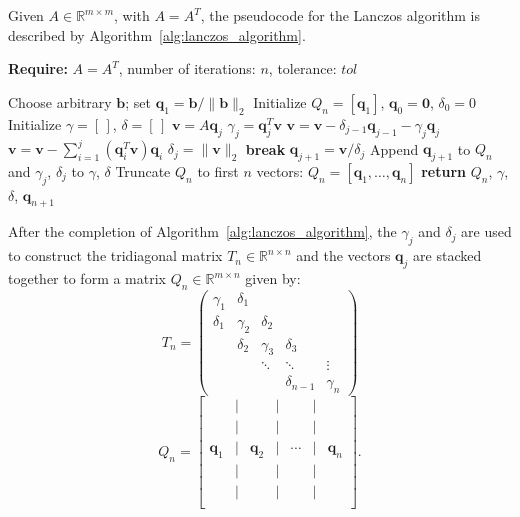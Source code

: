 Given $A \in \mathbb{R}^{m \times m}$, with $A=A^T$, the pseudocode for the Lanczos algorithm is described by Algorithm~\ref{alg:lanczos_algorithm}.
\begin{algorithm}
	\caption{Lanczos Algorithm for a Symmetric Matrix}
	\label{alg:lanczos_algorithm}

	\textbf{Require:} \( A = A^T \), number of iterations: \(n\), tolerance: \(tol\)
	\begin{algorithmic}[1]
		\State Choose arbitrary $\mathbf{b}$; set $\mathbf{q}_1 = \mathbf{b} / \|\mathbf{b}\|_2$
		\State Initialize $Q_n = [\mathbf{q}_1]$, $\mathbf{q}_0 = \mathbf{0}$, $\delta_0 = 0$
		\State Initialize $\gamma = [\,]$, $\delta = [\,]$ 
		\State $\mathbf{v} = A \mathbf{q}_j$ 
		\State $\gamma_j = \mathbf{q}_j^T \mathbf{v}$ 
		\State $\mathbf{v} = \mathbf{v} - \delta_{j-1}\mathbf{q}_{j-1} - \gamma_j \mathbf{q}_j$ 
		\State $\mathbf{v} = \mathbf{v} - \sum_{i=1}^j (\mathbf{q}_i^T \mathbf{v})\mathbf{q}_i$ 
		\State $\delta_j = \|\mathbf{v}\|_2$ 
		\State \textbf{break} 
		\EndIf 
		\State $\mathbf{q}_{j+1} = \mathbf{v} / \delta_j$
		\State Append $\mathbf{q}_{j+1}$ to $Q_n$ and $\gamma_j$, $\delta_j$ to $\gamma$, $\delta$
		\EndFor
		\State Truncate $Q_n$ to first $n$ vectors: $Q_n = [\mathbf{q}_1, \dots, \mathbf{q}_n]$
		\State \textbf{return} $Q_n$, $\gamma$, $\delta$, $\mathbf{q}_{n+1}$
		\EndFunction
	\end{algorithmic}
\end{algorithm}
After the completion of Algorithm~\ref{alg:lanczos_algorithm}, the $\gamma_j$ and $\delta_j$ are used to construct the tridiagonal matrix $T_n \in \mathbb{R}^{n \times n}$ and the vectors $\mathbf{q}_j$ are stacked together to form a matrix $Q_n \in \mathbb{R}^{m \times n}$ given by:
\[T_n = \begin{pmatrix}
			\gamma_1 & \delta_1 & & & \\\delta_1 & \gamma_2 & \delta_2 & & \\ & \delta_2 & \gamma_3 & \delta_3 & \\ & & \ddots & \ddots & \vdots \\ & & & \delta_{n-1} & \gamma_n
		\end{pmatrix}\] 
	\[
	Q_n = 
	\begin{bmatrix}
		 & \big| &  & \big| &  & \big| &  \\
		 & \big| &  & \big| &  & \big| &  \\
		 \mathbf{q}_1 & \big| & \mathbf{q}_2 & \big| & \cdots & \big| & \mathbf{q}_n \\
		 & \big| &  & \big| &  & \big| &  \\
		 & \big| &  & \big| &  & \big| &  \\
	\end{bmatrix}.
	\]
